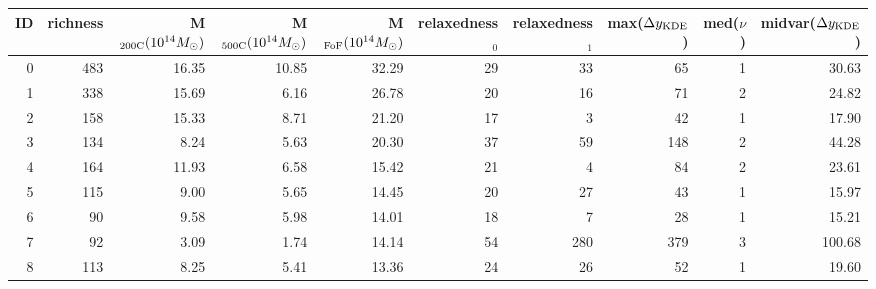 \begin{tabular}{rrrrrrrrrr}
\toprule
ID & richness & M$_{\rm 200C} (10^{14} M_\odot)$ & M$_{\rm 500C} (10^{14} M_\odot)$ & M$_{\rm FoF} (10^{14} M_\odot)$  & relaxedness$_0$ & relaxedness$_1$ & max($\Delta y_{\rm KDE}$) & med($\nu$) & midvar($\Delta y_{\rm KDE}$) \\
\midrule
 0 &      483 &                            16.35 &                            10.85 &                            32.29 &              29 &              33 &                        65 &          1 &                        30.63 \\
 1 &      338 &                            15.69 &                             6.16 &                            26.78 &              20 &              16 &                        71 &          2 &                        24.82 \\
 2 &      158 &                            15.33 &                             8.71 &                            21.20 &              17 &               3 &                        42 &          1 &                        17.90 \\
 3 &      134 &                             8.24 &                             5.63 &                            20.30 &              37 &              59 &                       148 &          2 &                        44.28 \\
 4 &      164 &                            11.93 &                             6.58 &                            15.42 &              21 &               4 &                        84 &          2 &                        23.61 \\
 5 &      115 &                             9.00 &                             5.65 &                            14.45 &              20 &              27 &                        43 &          1 &                        15.97 \\
 6 &       90 &                             9.58 &                             5.98 &                            14.01 &              18 &               7 &                        28 &          1 &                        15.21 \\
 7 &       92 &                             3.09 &                             1.74 &                            14.14 &              54 &             280 &                       379 &          3 &                       100.68 \\
 8 &      113 &                             8.25 &                             5.41 &                            13.36 &              24 &              26 &                        52 &          1 &                        19.60 \\

\end{tabular}

